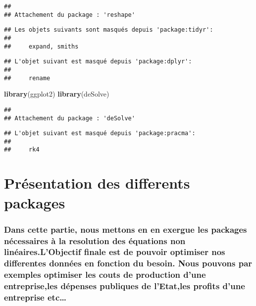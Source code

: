 \documentclass[
]{article}
\newenvironment{Shaded}{\begin{snugshade}}{\end{snugshade}}
\newcommand{\FunctionTok}[1]{\textcolor[rgb]{0.13,0.29,0.53}{\textbf{#1}}}
\newcommand{\NormalTok}[1]{#1}
\begin{document}
\begin{verbatim}
## 
## Attachement du package : 'reshape'
\end{verbatim}

\begin{verbatim}
## Les objets suivants sont masqués depuis 'package:tidyr':
## 
##     expand, smiths
\end{verbatim}

\begin{verbatim}
## L'objet suivant est masqué depuis 'package:dplyr':
## 
##     rename
\end{verbatim}

\begin{Shaded}
\begin{Highlighting}[]
\FunctionTok{library}\NormalTok{(ggplot2)}
\FunctionTok{library}\NormalTok{(deSolve)}
\end{Highlighting}
\end{Shaded}

\begin{verbatim}
## 
## Attachement du package : 'deSolve'
\end{verbatim}

\begin{verbatim}
## L'objet suivant est masqué depuis 'package:pracma':
## 
##     rk4
\end{verbatim}

\hypertarget{pruxe9sentation-des-differents-packages}{%
\section{Présentation des differents
packages}\label{pruxe9sentation-des-differents-packages}}

\hypertarget{dans-cette-partie-nous-mettons-en-en-exergue-les-packages-nuxe9cessaires-uxe0-la-resolution-des-uxe9quations-non-linuxe9aires.lobjectif-finale-est-de-pouvoir-optimiser-nos-differentes-donnuxe9es-en-fonction-du-besoin.-nous-pouvons-par-exemples-optimiser-les-couts-de-production-dune-entrepriseles-duxe9penses-publiques-de-letatles-profits-dune-entreprise-etc}{%
\subsubsection{Dans cette partie, nous mettons en en exergue les
packages nécessaires à la resolution des équations non
linéaires.L'Objectif finale est de pouvoir optimiser nos differentes
données en fonction du besoin. Nous pouvons par exemples optimiser les
couts de production d'une entreprise,les dépenses publiques de
l'Etat,les profits d'une entreprise
etc\ldots{}}\label{dans-cette-partie-nous-mettons-en-en-exergue-les-packages-nuxe9cessaires-uxe0-la-resolution-des-uxe9quations-non-linuxe9aires.lobjectif-finale-est-de-pouvoir-optimiser-nos-differentes-donnuxe9es-en-fonction-du-besoin.-nous-pouvons-par-exemples-optimiser-les-couts-de-production-dune-entrepriseles-duxe9penses-publiques-de-letatles-profits-dune-entreprise-etc}}
\end{document}

